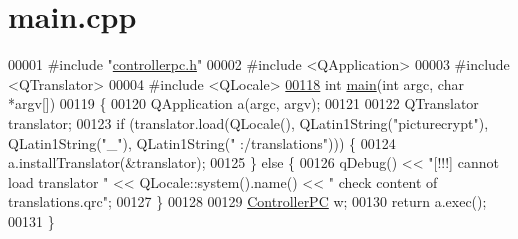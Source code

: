 \hypertarget{main_8cpp_source}{}\section{main.\+cpp}
\label{main_8cpp_source}

\begin{DoxyCode}
00001 \textcolor{preprocessor}{#include "\hyperlink{controllerpc_8h}{controllerpc.h}"}
00002 \textcolor{preprocessor}{#include <QApplication>}
00003 \textcolor{preprocessor}{#include <QTranslator>}
00004 \textcolor{preprocessor}{#include <QLocale>}
\hypertarget{main_8cpp_source.tex_l00118}{}\hyperlink{main_8cpp_a0ddf1224851353fc92bfbff6f499fa97}{00118} \textcolor{keywordtype}{int} \hyperlink{main_8cpp_a0ddf1224851353fc92bfbff6f499fa97}{main}(\textcolor{keywordtype}{int} argc, \textcolor{keywordtype}{char} *argv[])
00119 \{
00120     QApplication a(argc, argv);
00121 
00122     QTranslator translator;
00123     \textcolor{keywordflow}{if} (translator.load(QLocale(), QLatin1String(\textcolor{stringliteral}{"picturecrypt"}), QLatin1String(\textcolor{stringliteral}{"\_"}), QLatin1String(\textcolor{stringliteral}{"
      :/translations"}))) \{
00124         a.installTranslator(&translator);
00125     \} \textcolor{keywordflow}{else} \{
00126         qDebug() << \textcolor{stringliteral}{"[!!!] cannot load translator "} << QLocale::system().name() << \textcolor{stringliteral}{" check content of
       translations.qrc"};
00127     \}
00128 
00129     \hyperlink{class_controller_p_c}{ControllerPC} w;
00130     \textcolor{keywordflow}{return} a.exec();
00131 \}
\end{DoxyCode}
